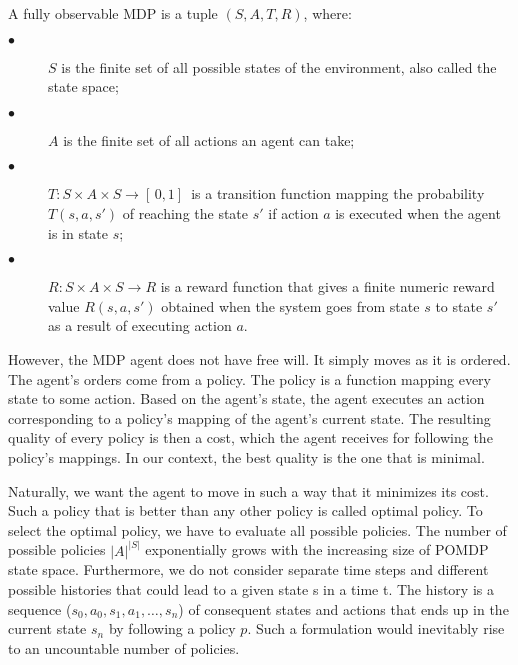 \begin{definition}\label{def:MDP}
A fully observable MDP is a tuple $(S, A, T, R)$, where:
\begin{description}
  \item[$\bullet$ ] $S$ is the finite set of all possible states of the environment, also called the state space;
  \item[$\bullet$ ] $A$ is the finite set of all actions an agent can take;
  \item[$\bullet$ ] $T : S \times A \times S \rightarrow [ \,0, 1] \,$ is a transition function mapping the probability $T(s, a, s')$ of reaching the state $s'$ if action $a$ is executed when the agent is in state $s$;
  \item[$\bullet$ ] $R : S \times A \times S \rightarrow R$ is a reward function that gives a finite numeric reward value $R(s, a, s')$ obtained when the system goes from state $s$ to state $s'$ as a result of executing action $a$.
\end{description}
\end{definition}

However, the MDP agent does not have free will. It simply moves as it is ordered. The agent's orders come from a policy. The policy is a function mapping every state to some action. Based on the agent's state, the agent executes an action corresponding to a policy's mapping of the agent's current state. The resulting quality of every policy is then a cost, which the agent receives for following the policy's mappings. In our context, the best quality is the one that is minimal.

Naturally, we want the agent to move in such a way that it minimizes its cost. Such a policy that is better than any other policy is called optimal policy. To select the optimal policy, we have to evaluate all possible policies. The number of possible policies $|A|^{|S|}$ exponentially grows with the increasing size of POMDP state space. Furthermore, we do not consider separate time steps and different possible histories that could lead to a given state s in a time t. The history is a sequence ($s_0, a_0, s_1, a_1, \ldots, s_n$) of consequent states and actions that ends up in the current state $s_n$ by following a policy $p$. Such a formulation would inevitably rise to an uncountable number of policies.

